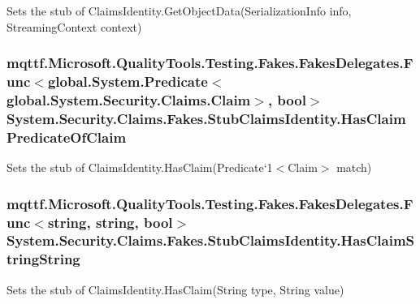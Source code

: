 Sets the stub of Claims\-Identity.\-Get\-Object\-Data(\-Serialization\-Info info, Streaming\-Context context)

\hypertarget{class_system_1_1_security_1_1_claims_1_1_fakes_1_1_stub_claims_identity_ac1854b3a8ed168fa643429c30b17da6e}{
\subsubsection[{Has\-Claim\-Predicate\-Of\-Claim}]{\setlength{\rightskip}{0pt plus 5cm}mqttf.\-Microsoft.\-Quality\-Tools.\-Testing.\-Fakes.\-Fakes\-Delegates.\-Func$<$global.\-System.\-Predicate$<$global.\-System.\-Security.\-Claims.\-Claim$>$, bool$>$ System.\-Security.\-Claims.\-Fakes.\-Stub\-Claims\-Identity.\-Has\-Claim\-Predicate\-Of\-Claim}}\label{class_system_1_1_security_1_1_claims_1_1_fakes_1_1_stub_claims_identity_ac1854b3a8ed168fa643429c30b17da6e}


Sets the stub of Claims\-Identity.\-Has\-Claim(Predicate`1$<$Claim$>$ match)

\hypertarget{class_system_1_1_security_1_1_claims_1_1_fakes_1_1_stub_claims_identity_a8dfe85f6eb742c250175b65ac9a86d6e}{
\subsubsection[{Has\-Claim\-String\-String}]{\setlength{\rightskip}{0pt plus 5cm}mqttf.\-Microsoft.\-Quality\-Tools.\-Testing.\-Fakes.\-Fakes\-Delegates.\-Func$<$string, string, bool$>$ System.\-Security.\-Claims.\-Fakes.\-Stub\-Claims\-Identity.\-Has\-Claim\-String\-String}}\label{class_system_1_1_security_1_1_claims_1_1_fakes_1_1_stub_claims_identity_a8dfe85f6eb742c250175b65ac9a86d6e}


Sets the stub of Claims\-Identity.\-Has\-Claim(\-String type, String value)

